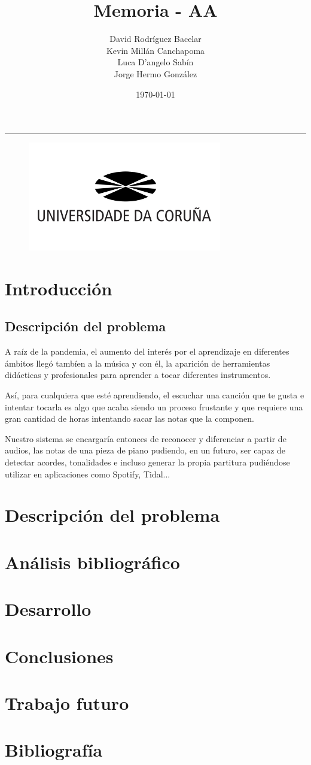 \documentclass{article}
\title{\textbf{\huge Memoria - AA}}
\author{{David Rodríguez Bacelar} \\[0.25cm] {Kevin Millán Canchapoma} \\[0.25cm]{Luca D'angelo Sabín} \\[0.25cm]{Jorge Hermo González}}
\date{\today}
\newcommand{\HRule}{\rule{\linewidth}{0.5mm}}
\begin{document}
\maketitle
\HRule
\bigskip\bigskip\bigskip\bigskip\bigskip\bigskip
\begin{figure}[h!]
	\centering
	\includegraphics[height=180px]{udc.jpg}
	\label{fig:diagram1}
\end{figure}

\newpage

\tableofcontents

\newpage
\section{Introducción}

\subsection{Descripción del problema}
A raíz de la pandemia, el aumento del interés por el aprendizaje en diferentes ámbitos llegó tambíen a la música y con él, la aparición
de herramientas didácticas y profesionales para aprender a tocar diferentes instrumentos.

Así, para cualquiera que esté aprendiendo, el escuchar una canción que te gusta e intentar tocarla es algo que acaba siendo un proceso
frustante y que requiere una gran cantidad de horas intentando sacar las notas que la componen.

Nuestro sistema se encargaría entonces de reconocer y diferenciar a partir de audios, las notas de una pieza de piano
pudiendo, en un futuro, ser capaz de detectar acordes, tonalidades e incluso generar la propia partitura pudiéndose 
utilizar en aplicaciones como Spotify, Tidal...


\section{Descripción del problema}

\section{Análisis bibliográfico}

\section{Desarrollo}

\section{Conclusiones}

\section{Trabajo futuro}

\section{Bibliografía}
\end{document}

